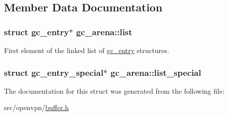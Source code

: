 \subsection{Member Data Documentation}
\hypertarget{structgc__arena_a88f958412dce42ad5ab9ca27bfb40d4f}{}
\subsubsection[{list}]{\setlength{\rightskip}{0pt plus 5cm}struct {\bf gc\+\_\+entry}$\ast$ gc\+\_\+arena\+::list}\label{structgc__arena_a88f958412dce42ad5ab9ca27bfb40d4f}
First element of the linked list of {\ttfamily \hyperlink{structgc__entry}{gc\+\_\+entry}} structures. \hypertarget{structgc__arena_a31784b2c6728308bae3acc81e2a25a11}{}
\subsubsection[{list\+\_\+special}]{\setlength{\rightskip}{0pt plus 5cm}struct {\bf gc\+\_\+entry\+\_\+special}$\ast$ gc\+\_\+arena\+::list\+\_\+special}\label{structgc__arena_a31784b2c6728308bae3acc81e2a25a11}


The documentation for this struct was generated from the following file\+:\begin{DoxyCompactItemize}
\item 
src/openvpn/\hyperlink{buffer_8h}{buffer.\+h}\end{DoxyCompactItemize}
